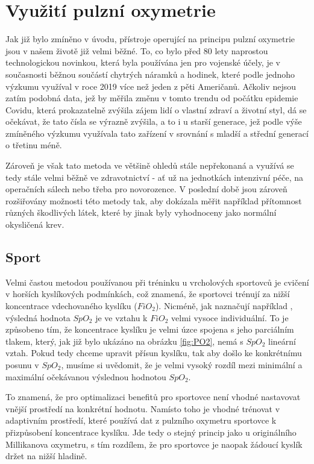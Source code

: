 \section {Využití pulzní oxymetrie}
Jak již bylo zmíněno v úvodu, přístroje operující na principu pulzní oxymetrie jsou v našem životě již velmi běžné. To, co bylo před 80 lety naprostou technologickou novinkou, která byla používána jen pro vojenské účely, je v současnosti běžnou součástí chytrých náramků a hodinek, které podle jednoho výzkumu \citep{wearables} využíval v roce 2019 více než jeden z pěti Američanů. Ačkoliv nejsou zatím podobná data, jež by měřila změnu v tomto trendu od počátku epidemie Covidu, která prokazatelně zvýšila zájem lidí o vlastní zdraví a životní styl, dá se očekávat, že tato čísla se výrazně zvýšila, a to i u starší generace, jež podle výše zmíněného výzkumu využívala tato zařízení v srovnání s mladší a střední generací o třetinu méně.
\par Zároveň je však tato metoda ve většině ohledů stále nepřekonaná a využívá se tedy stále velmi běžně ve zdravotnictví - ať už na jednotkách intenzivní péče, na operačních sálech nebo třeba pro novorozence. V poslední době jsou zároveň rozšiřovány možnosti této metody tak, aby dokázala měřit například přítomnost různých škodlivých látek, které by jinak byly vyhodnoceny jako normální okysličená krev.
\subsection {Sport}
Velmi častou metodou používanou při tréninku u vrcholových sportovců je cvičení v horších kyslíkových podmínkách, což znamená, že sportovci trénují za nižší koncentrace vdechovaného kyslíku ($FiO_2$). Nicméně, jak naznačují například \cite{fio2}, výsledná hodnota $SpO_2$ je ve vztahu k $FiO_2$ velmi vysoce individuální. To je způsobeno tím, že koncentrace kyslíku je velmi úzce spojena s jeho parciálním tlakem, který, jak již bylo ukázáno na obrázku \ref{fig:PO2}, nemá s $SpO_2$ lineární vztah. Pokud tedy chceme upravit přísun kyslíku, tak aby došlo ke konkrétnímu posunu v $SpO_2$, musíme si uvědomit, že je velmi vysoký rozdíl mezi minimální a maximální očekávanou výslednou hodnotou $SpO_2$. 
\par To znamená, že pro optimalizaci benefitů pro sportovce není vhodné nastavovat vnější prostředí na konkrétní hodnotu. Namísto toho je vhodné trénovat v adaptivním prostředí, které používá dat z pulzního oxymetru sportovce k přizpůsobení koncentrace kyslíku. Jde tedy o stejný princip jako u originálního Millikanova oxymetru, s tím rozdílem, že pro sportovce je naopak žádoucí kyslík držet na nižší hladině. \citep{sportuse}
